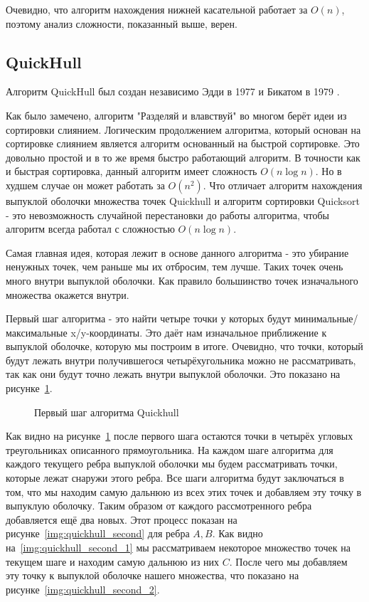 Очевидно, что алгоритм нахождения нижней касательной работает за $O(n)$, поэтому анализ сложности, показанный выше, верен.

\subsection{QuickHull} \label{subsect1_1_4}

Алгоритм QuickHull был создан независимо Эдди в 1977 и Бикатом в 1979 \cite{barber1996Quickhull}.

Как было замечено, алгоритм "Разделяй и влавствуй" во многом берёт идеи из сортировки слиянием. Логическим продолжением алгоритма, который основан на сортировке слиянием является алгоритм основанный на быстрой сортировке. Это довольно простой и в то же время быстро работающий алгоритм. В точности как и быстрая сортировка, данный алгоритм имеет сложность $O(n \log n)$. Но в худшем случае он может работать за $O(n^2)$. Что отличает алгоритм нахождения выпуклой оболочки множества точек Quickhull и алгоритм сортировки Quicksort - это невозможность случайной перестановки до работы алгоритма, чтобы алгоритм всегда работал с сложностью $O(n \log n)$.

Самая главная идея, которая лежит в основе данного алгоритма - это убирание ненужных точек, чем раньше мы их отбросим, тем лучше. Таких точек очень много внутри выпуклой оболочки. Как правило большинство точек изначального множества окажется внутри.

Первый шаг алгоритма - это найти четыре точки у которых будут минимальные/максимальные x/y-координаты. Это даёт нам изначальное приближение к выпуклой оболочке, которую мы построим в итоге. Очевидно, что точки, который будут лежать внутри получившегося четырёхугольника можно не рассматривать, так как они будут точно лежать внутри выпуклой оболочки. Это показано на рисунке~\ref{img:quickhull_first}.

\begin{figure}[H]
	{\centering
		\hfill
		\subbottom{%
			}
		\hfill
	}
	\caption{Первый шаг алгоритма Quickhull}
	\label{img:quickhull_first}
\end{figure}

Как видно на рисунке~\ref{img:quickhull_first} после первого шага остаются точки в четырёх угловых треугольниках описанного прямоугольника. На каждом шаге алгоритма для каждого текущего ребра выпуклой оболочки мы будем рассматривать точки, которые лежат снаружи этого ребра. Все шаги алгоритма будут заключаться в том, что мы находим самую дальнюю из всех этих точек и добавляем эту точку в выпуклую оболочку. Таким образом от каждого рассмотренного ребра добавляется ещё два новых. Этот процесс показан на рисунке~\ref{img:quickhull_second} для ребра $A, B$. Как видно на~\ref{img:quickhull_second_1} мы рассматриваем некоторое множество точек на текущем шаге и находим самую дальнюю из них $C$. После чего мы добавляем эту точку к выпуклой оболочке нашего множества, что показано на рисунке~\ref{img:quickhull_second_2}.

